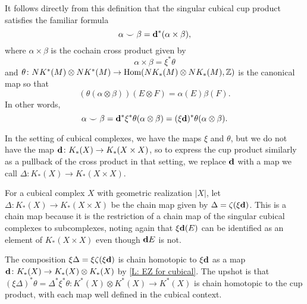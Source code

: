 \begin{comment}
	Let $M$ be a manifold (with or without corners) cubulated by the cubical complex $X$.
	Recall from \cref{S: cubical products} that the cup product for cubical or singular cubical cohomology is defined by the cochain-level formula
	\begin{equation}\label{E: cubical cup}
		(\alpha \smile \beta)(S) = (\alpha \otimes \beta)(\xi(\diag S)),
	\end{equation}
	where $\diag \colon M \to M \times M$ is the diagonal map and $\xi \colon NK_*(M \times M) \to NK_*(M) \otimes NK_*(M)$ is a chain homotopy inverse to the cross product $\zeta \colon NK_*(M) \otimes NK_*(M) \to NK_*(M \times M)$.
	This formula also functions in the cubical complex setting, as the composition $\xi \diag$ takes a face of a cubical complex $X$ to an element of $K_*(X) \otimes K_*(X) \subset NK_*(M) \otimes NK_*(M)$.
\end{comment}

It follows directly from this definition that the singular cubical cup product satisfies the familiar formula $$\alpha \smile \beta = \mathbf{d}^*(\alpha \times \beta),$$
where $\alpha \times \beta$ is the cochain cross product given by $$\alpha \times \beta = \xi^*\theta$$
and $\theta \colon NK^*(M) \otimes NK^*(M) \to \textup{Hom}(NK_*(M) \otimes NK_*(M),\mathbb{Z})$ is the canonical map so that $$(\theta(\alpha \otimes \beta))(E \otimes F) = \alpha(E)\beta(F).$$
In other words, $$\alpha \smile \beta = \mathbf{d}^* \xi^* \theta(\alpha \otimes \beta) = (\xi \mathbf{d})^*\theta (\alpha \otimes \beta).$$

In the setting of cubical complexes, we have the maps $\xi$ and $\theta$, but we do not have the map $\mathbf{d} \colon K_*(X) \to K_*(X \times X) $, so to express the cup product similarly as a pullback of the cross product in that setting, we replace $\mathbf{d}$ with a map we call $\Delta \colon K_*(X) \to K_*(X \times X)$.

\begin{definition}\label{D: Delta}
	For a cubical complex $X$ with geometric realization $|X|$, let $\Delta \colon K_*(X) \to K_*(X \times X)$ be the chain map given by $\Delta = \zeta(\xi\mathbf{d})$.
	This is a chain map because it is the restriction of a chain map of the singular cubical complexes to subcomplexes, noting again that $\xi\mathbf{d}(E)$ can be identified as an element of $K_*(X \times X)$ even though $\mathbf{d} E$ is not.
\end{definition}

The composition $\xi \Delta = \xi \zeta (\xi \mathbf{d})$ is chain homotopic to $\xi \mathbf{d}$ as a map $\mathbf{d} \colon K_*(X) \to K_*(X) \otimes K_*(X)$ by \cref{L: EZ for cubical}.
The upshot is that $(\xi \Delta)^*\theta = \Delta^* \xi^* \theta \colon K^*(X) \otimes K^*(X) \to K^*(X)$ is chain homotopic to the cup product, with each map well defined in the cubical context.

